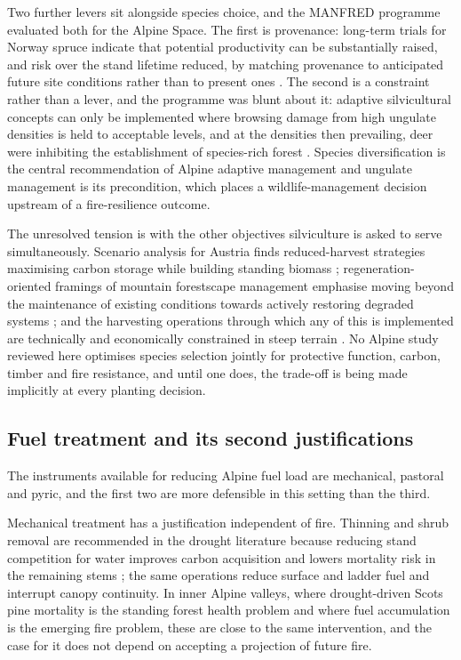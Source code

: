\documentclass[11pt,a4paper]{article}
\begin{document}
Two further levers sit alongside species choice, and the MANFRED programme evaluated both for the Alpine Space. The first is provenance: long-term trials for Norway spruce indicate that potential productivity can be substantially raised, and risk over the stand lifetime reduced, by matching provenance to anticipated future site conditions rather than to present ones \citep{jandl_management_2013}. The second is a constraint rather than a lever, and the programme was blunt about it: adaptive silvicultural concepts can only be implemented where browsing damage from high ungulate densities is held to acceptable levels, and at the densities then prevailing, deer were inhibiting the establishment of species-rich forest \citep{jandl_management_2013}. Species diversification is the central recommendation of Alpine adaptive management and ungulate management is its precondition, which places a wildlife-management decision upstream of a fire-resilience outcome.

The unresolved tension is with the other objectives silviculture is asked to serve simultaneously. Scenario analysis for Austria finds reduced-harvest strategies maximising carbon storage while building standing biomass \citep{jandl_strategies_2018}; regeneration-oriented framings of mountain forestscape management emphasise moving beyond the maintenance of existing conditions towards actively restoring degraded systems \citep{majlingova_sustainability_2025}; and the harvesting operations through which any of this is implemented are technically and economically constrained in steep terrain \citep{dinca_timber_2025}. No Alpine study reviewed here optimises species selection jointly for protective function, carbon, timber and fire resistance, and until one does, the trade-off is being made implicitly at every planting decision.

\subsection{Fuel treatment and its second justifications}

The instruments available for reducing Alpine fuel load are mechanical, pastoral and pyric, and the first two are more defensible in this setting than the third.

Mechanical treatment has a justification independent of fire. Thinning and shrub removal are recommended in the drought literature because reducing stand competition for water improves carbon acquisition and lowers mortality risk in the remaining stems \citep{giuggiola_droughtinduced_2010}; the same operations reduce surface and ladder fuel and interrupt canopy continuity. In inner Alpine valleys, where drought-driven Scots pine mortality is the standing forest health problem and where fuel accumulation is the emerging fire problem, these are close to the same intervention, and the case for it does not depend on accepting a projection of future fire.
\end{document}
